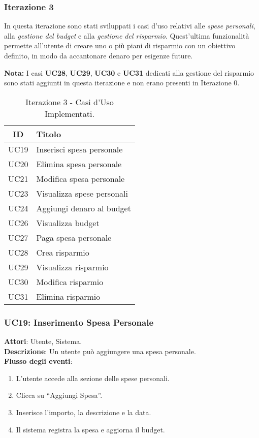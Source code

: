 \subsubsection{Iterazione 3}
In questa iterazione sono stati sviluppati i casi d’uso relativi alle \emph{spese personali}, alla \emph{gestione del budget} e alla \emph{gestione del risparmio}. Quest’ultima funzionalità permette all’utente di creare uno o più piani di risparmio con un obiettivo definito, in modo da accantonare denaro per esigenze future.

\textbf{Nota:} I casi \textbf{UC28}, \textbf{UC29}, \textbf{UC30} e \textbf{UC31} dedicati alla gestione del risparmio sono stati aggiunti in questa iterazione e non erano presenti in Iterazione 0.

\begin{table}[h]
    \centering
    \begin{tabular}{|c|l|}
    \hline
    \textbf{ID} & \textbf{Titolo} \\ \hline
    UC19 & Inserisci spesa personale \\ \hline
    UC20 & Elimina spesa personale \\ \hline
    UC21 & Modifica spesa personale \\ \hline
    UC23 & Visualizza spese personali \\ \hline
    UC24 & Aggiungi denaro al budget \\ \hline
    UC26 & Visualizza budget \\ \hline
    UC27 & Paga spesa personale \\ \hline
    UC28 & Crea risparmio \\ \hline
    UC29 & Visualizza risparmio \\ \hline
    UC30 & Modifica risparmio \\ \hline
    UC31 & Elimina risparmio \\ \hline
    \end{tabular}
    \caption{Iterazione 3 - Casi d’Uso Implementati.}
\end{table}

\subsubsection{UC19: Inserimento Spesa Personale}
\textbf{Attori}: Utente, Sistema. \\
\textbf{Descrizione}: Un utente può aggiungere una spesa personale. \\
\textbf{Flusso degli eventi}:
\begin{enumerate}
    \item L’utente accede alla sezione delle spese personali.
    \item Clicca su ``Aggiungi Spesa''.
    \item Inserisce l’importo, la descrizione e la data.
    \item Il sistema registra la spesa e aggiorna il budget.
\end{enumerate}

